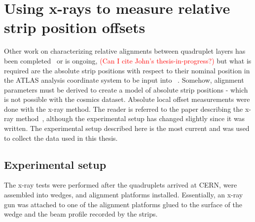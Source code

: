 
\chapter{Using x-rays to measure relative strip position offsets}
\label{chap:xray}


Other work on characterizing relative alignments between quadruplet layers has been completed~\cite{zhao_cosmic_2019} or is ongoing, \textcolor{red}{(Can I cite John's thesis-in-progress?)} but what is required are the absolute strip positions with respect to their nominal position in the ATLAS analysis coordinate system to be input into ~\cite{the_atlas_collaboration_athena}. Somehow, alignment parameters must be derived to create a model of absolute strip positions - which is not possible with the cosmics dataset. Absolute local offset measurements were done with the x-ray method. The reader is referred to the paper describing the x-ray method~\cite{lefebvre_precision_2020}, although the experimental setup has changed slightly since it was written. The experimental setup described here is the most current and was used to collect the data used in this thesis.

\section{Experimental setup}

The x-ray tests were performed after the quadruplets arrived at CERN, were assembled into wedges, and alignment platforms installed. Essentially, an x-ray gun was attached to one of the alignment platforms glued to the surface of the wedge and the beam profile recorded by the strips.

